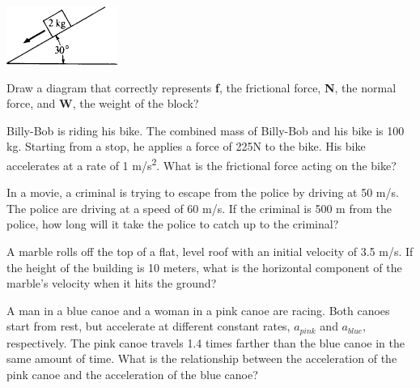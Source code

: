 \documentclass[10pt]{examdesign}
\begin{document}
\begin{multiplechoice} [title={Multiple Choice},
	rearrange=yes]
\begin{question}
	\begin{center}
		\includegraphics[height={0.75in}]{incp.png}
	\end{center}	
	
	
Draw a diagram that correctly represents \textbf{f}, the frictional force, \textbf{N}, the normal force, and \textbf{W}, the weight of the block?
	\vspace{1in}
	

\end{question}


\begin{question}
	Billy-Bob is riding his bike.  The combined mass of Billy-Bob and his bike is 100 kg.  Starting from a stop, he applies a force of 225N to the bike.  His bike accelerates at a rate of 1 m/s\textsuperscript{2}.  What is the frictional force acting on the bike? 

\end{question}



\begin{question}
	In a movie, a criminal is trying to escape from the police by driving at 50 m/s. The police are driving at a speed of 60 m/s.  If the criminal is 500 m from the police, how long will it take the police to catch up to the criminal?  

\end{question}



\begin{question}
	A marble rolls off the top of a flat, level roof with an initial velocity of 3.5 m/s.  If the height of the building is 10 meters, what is the horizontal component of the marble's velocity when it hits the ground?

\end{question}


\begin{question}
	 A man in a blue canoe and a woman in a pink canoe are racing.  Both canoes start from rest, but accelerate at different constant rates, $a_{pink}$ and $a_{blue}$, respectively.  The pink canoe travels 1.4 times farther than the blue canoe in the same amount of time. What is the relationship between the acceleration of the pink canoe and the acceleration of the blue canoe?


\end{question}
\end{multiplechoice}
\end{document}
